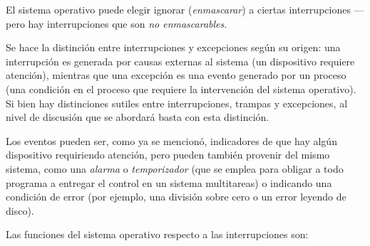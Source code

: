 \documentclass[11pt,fleqn]{book} %
\begin{document}
El sistema operativo puede elegir ignorar (\emph{enmascarar}) a ciertas
interrupciones — pero hay interrupciones que son \emph{no enmascarables}.

Se hace la distinción entre interrupciones y excepciones según su
origen: una interrupción es generada por causas externas al sistema
(un dispositivo requiere atención), mientras que una excepción es una
evento generado por un proceso (una condición en el proceso que
requiere la intervención del sistema operativo). Si bien hay
distinciones sutiles entre interrupciones, trampas y excepciones, al
nivel de discusión que se abordará basta con esta distinción.

Los eventos pueden ser, como ya se mencionó, indicadores de que hay algún
dispositivo requiriendo atención, pero pueden también provenir del
mismo sistema, como una \emph{alarma} o \emph{temporizador} (que se emplea para
obligar a todo programa a entregar el control en un sistema
multitareas) o indicando una condición de error (por ejemplo, una
división sobre cero o un error leyendo de disco).

Las funciones del sistema operativo respecto a las interrupciones son:
\end{document}
